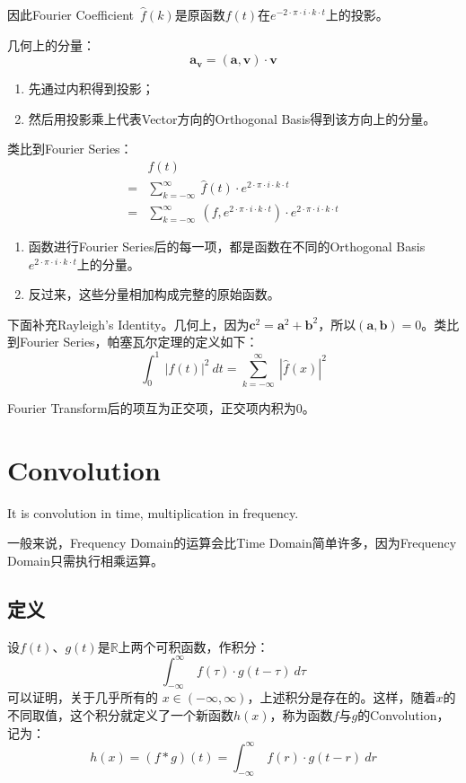 因此Fourier Coefficient\ $\hat{f}(k)$是原函数$f(t)$在$e^{-2\cdot \pi\cdot i\cdot k\cdot t}$上的投影。

几何上的分量：
$$
	\mathbf{a}_{\mathbf{v}}=(\mathbf{a},\mathbf{v})\cdot \mathbf{v}
$$
\begin{enumerate}
	\item 先通过内积得到投影；
	\item 然后用投影乘上代表Vector方向的Orthogonal Basis得到该方向上的分量。
\end{enumerate}

类比到Fourier Series：
\begin{align*}
	  & f(t)                                                                                                             \\
	= & \sum\limits_{k=-\infty}^\infty \ \hat{f}(t)\cdot e^{2\cdot \pi\cdot i\cdot k\cdot t}                             \\
	= & \sum\limits_{k=-\infty}^\infty\ (f,e^{2\cdot \pi\cdot i\cdot k\cdot t})\cdot e^{2\cdot \pi\cdot i\cdot k\cdot t}
\end{align*}

\begin{enumerate}
	\item 函数进行Fourier Series后的每一项，都是函数在不同的Orthogonal Basis$e^{2\cdot \pi\cdot i\cdot k\cdot t}$上的分量。
	\item 反过来，这些分量相加构成完整的原始函数。
\end{enumerate}

下面补充Rayleigh's Identity。几何上，因为$\mathbf{c}^2=\mathbf{a}^2+\mathbf{b}^2$，所以$(\mathbf{a},\mathbf{b})=0$。类比到Fourier Series，帕塞瓦尔定理的定义如下：
$$
	\int_0^1\ |f(t)|^2\ dt=\sum\limits_{k=-\infty}^{\infty}\ |\hat{f}(x)|^2
$$

Fourier Transform后的项互为正交项，正交项内积为$0$。
\section{Convolution}
It is convolution in time, multiplication in frequency.

一般来说，Frequency Domain的运算会比Time Domain简单许多，因为Frequency Domain只需执行相乘运算。
\subsection{定义}
设$f(t)$、$g(t)$是$\mathbb{R}$上两个可积函数，作积分：
$$
	\int_{-\infty}^\infty\ f(\tau)\cdot g(t-\tau)\ d\tau
$$
可以证明，关于几乎所有的 $x\in (-\infty ,\infty )$，上述积分是存在的。这样，随着$x$的不同取值，这个积分就定义了一个新函数$h(x)$，称为函数$f$与$g$的Convolution，记为：
$$
	h(x)=(f*g)(t)=\int_{-\infty}^{\infty}\ f(r)\cdot g(t-r)\ dr
$$
